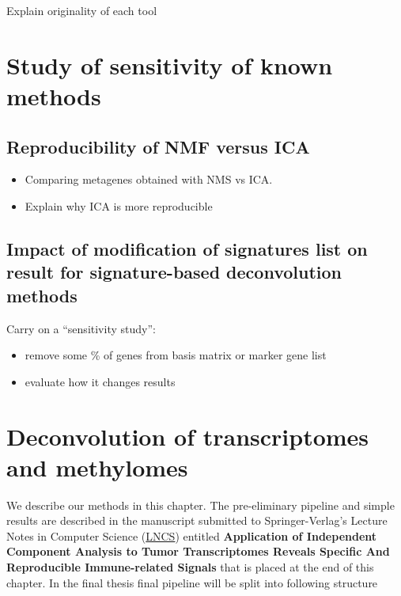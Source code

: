 \documentclass[12pt,]{book}
\providecommand{\tightlist}{%
  \setlength{\itemsep}{0pt}\setlength{\parskip}{0pt}}
\theoremstyle{definition}
\theoremstyle{definition}
\theoremstyle{definition}
\theoremstyle{remark}
\begin{document}
Explain originality of each tool

\hypertarget{study-of-sensitivity-of-known-methods}{%
\chapter{Study of sensitivity of known
methods}\label{study-of-sensitivity-of-known-methods}}

\hypertarget{reproducibility-of-nmf-versus-ica}{%
\section{Reproducibility of NMF versus
ICA}\label{reproducibility-of-nmf-versus-ica}}

\begin{itemize}
\tightlist
\item
  Comparing metagenes obtained with NMS vs ICA.
\item
  Explain why ICA is more reproducible
\end{itemize}

\hypertarget{impact-of-modification-of-signatures-list-on-result-for-signature-based-deconvolution-methods}{%
\section{Impact of modification of signatures list on result for
signature-based deconvolution
methods}\label{impact-of-modification-of-signatures-list-on-result-for-signature-based-deconvolution-methods}}

Carry on a ``sensitivity study'':

\begin{itemize}
\tightlist
\item
  remove some \% of genes from basis matrix or marker gene list
\item
  evaluate how it changes results
\end{itemize}

\hypertarget{deconvolution-of-transcriptomes-and-methylomes}{%
\chapter{Deconvolution of transcriptomes and
methylomes}\label{deconvolution-of-transcriptomes-and-methylomes}}

We describe our methods in this chapter. The pre-eliminary pipeline and
simple results are described in the manuscript submitted to
Springer-Verlag's Lecture Notes in Computer Science
(\href{http://www.springer.com/gb/computer-science/lncs}{LNCS}) entitled
\textbf{Application of Independent Component Analysis to Tumor
Transcriptomes Reveals Specific And Reproducible Immune-related Signals}
that is placed at the end of this chapter. In the final thesis final
pipeline will be split into following structure
\end{document}
